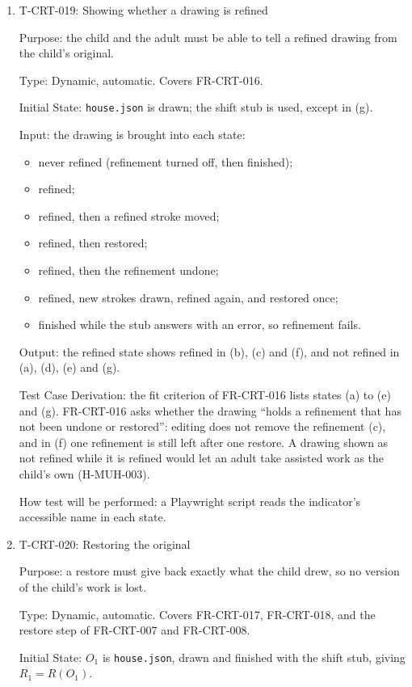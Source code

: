 \documentclass[12pt, titlepage]{article}
\newcommand{\testitem}[1]{\item #1\par\nopagebreak}
\begin{document}
\begin{enumerate}
How test will be performed: a Playwright script, run with T-CRT-014.

\testitem{T-CRT-019: Showing whether a drawing is refined}

Purpose: the child and the adult must be able to tell a refined drawing
from the child's original.

Type: Dynamic, automatic. Covers FR-CRT-016.

Initial State: \texttt{house.json} is drawn; the shift stub is used, except
in (g).

Input: the drawing is brought into each state:
\begin{itemize}
\item[(a)] never refined (refinement turned off, then finished);
\item[(b)] refined;
\item[(c)] refined, then a refined stroke moved;
\item[(d)] refined, then restored;
\item[(e)] refined, then the refinement undone;
\item[(f)] refined, new strokes drawn, refined again, and restored once;
\item[(g)] finished while the stub answers with an error, so refinement
fails.
\end{itemize}

Output: the refined state shows refined in (b), (c) and (f), and not refined
in (a), (d), (e) and (g).

Test Case Derivation: the fit criterion of FR-CRT-016 lists states (a) to
(e) and (g). FR-CRT-016 asks whether the drawing ``holds a refinement that
has not been undone or restored'': editing does not remove the refinement
(c), and in (f) one refinement is still left after one restore. A drawing
shown as not refined while it is refined would let an adult take assisted
work as the child's own (H-MUH-003).

How test will be performed: a Playwright script reads the indicator's
accessible name in each state.

\testitem{T-CRT-020: Restoring the original}

Purpose: a restore must give back exactly what the child drew, so no
version of the child's work is lost.

Type: Dynamic, automatic. Covers FR-CRT-017, FR-CRT-018, and the restore
step of FR-CRT-007 and FR-CRT-008.

Initial State: $O_1$ is \texttt{house.json}, drawn and finished with the
shift stub, giving $R_1 = R(O_1)$.


\end{enumerate}
\end{document}
